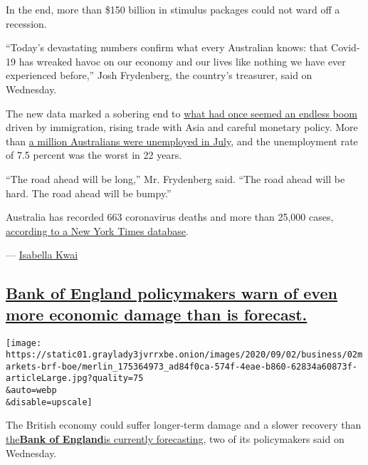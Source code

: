 In the end, more than \$150 billion in stimulus packages could not ward
off a recession.

``Today's devastating numbers confirm what every Australian knows: that
Covid-19 has wreaked havoc on our economy and our lives like nothing we
have ever experienced before,'' Josh Frydenberg, the country's
treasurer, said on Wednesday.

The new data marked a sobering end to
\href{https://www.nytimes3xbfgragh.onion/2020/03/27/world/australia/australia-coronavirus-economy.html}{what
had once seemed an endless boom} driven by immigration, rising trade
with Asia and careful monetary policy. More than
\href{https://www.abs.gov.au/ausstats/abs@.nsf/mf/6202.0}{a million
Australians were unemployed in July}, and the unemployment rate of 7.5
percent was the worst in 22 years.

``The road ahead will be long,'' Mr. Frydenberg said. ``The road ahead
will be hard. The road ahead will be bumpy.''

Australia has recorded 663 coronavirus deaths and more than 25,000
cases,
\href{https://www.nytimes3xbfgragh.onion/interactive/2020/world/coronavirus-maps.html\#countries}{according
to a New York Times database}.

--- \href{https://www.nytimes3xbfgragh.onion/by/isabella-kwai}{Isabella
Kwai}

\hypertarget{bank-of-england-policymakers-warn-of-even-more-economic-damage-than-is-forecast}{%
\subsection{\texorpdfstring{\protect\hyperlink{bank-of-england-policymakers-warn-of-even-more-economic-damage-than-is-forecast}{Bank
of England policymakers warn of even more economic damage than is
forecast.}}{Bank of England policymakers warn of even more economic damage than is forecast.}}\label{bank-of-england-policymakers-warn-of-even-more-economic-damage-than-is-forecast}}

\texttt{[image: https://static01.graylady3jvrrxbe.onion/images/2020/09/02/business/02markets-brf-boe/merlin\_175364973\_ad84f0ca-574f-4eae-b860-62834a60873f-articleLarge.jpg?quality=75\\\&auto=webp\\\&disable=upscale]}

The British economy could suffer longer-term damage and a slower
recovery than
\href{https://www.nytimes3xbfgragh.onion/2020/08/06/business/britains-economy-wont-fully-recover-till-end-of-2021-its-central-bankers-said.html}{the}\textbf{\href{https://www.nytimes3xbfgragh.onion/2020/08/06/business/britains-economy-wont-fully-recover-till-end-of-2021-its-central-bankers-said.html}{Bank
of
England}}\href{https://www.nytimes3xbfgragh.onion/2020/08/06/business/britains-economy-wont-fully-recover-till-end-of-2021-its-central-bankers-said.html}{is
currently forecasting}, two of its policymakers said on Wednesday.

